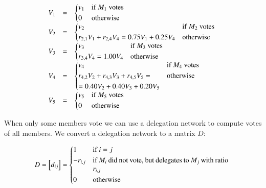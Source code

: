 \documentclass{sigchi}
\begin{document}
\begin{displaymath}
\begin{array}{rcl}
V_1 & = & \begin{dcases*}
 v_1 & if $M_1$ votes \\
 0 & otherwise \\
\end{dcases*} \\
V_2 & = & \begin{dcases*}
 v_2 & if $M_2$ votes \\
 r_{2,1} V_1 + r_{2,4} V_4 = 0.75 V_1 + 0.25 V_4 & otherwise \\
\end{dcases*} \\
V_3 & = & \begin{dcases*}
 v_3 & if $M_3$ votes \\
 r_{3,4} V_4 = 1.00 V_4 & otherwise \\
\end{dcases*} \\
V_4 & = & \begin{dcases*}
 v_4 & if $M_4$ votes \\
 r_{4,2} V_2+ r_{4,3} V_3 + r_{4,5} V_5 = & otherwise \\
 = 0.40 V_2 + 0.40 V_3 + 0.20 V_5 & \\
\end{dcases*} \\
V_5 & = & \begin{dcases*}
 v_5 & if $M_5$ votes \\
 0 & otherwise \\
\end{dcases*} \\
\end{array}
\end{displaymath}

When only some members vote we can use a delegation network to compute votes
of all members.
We convert a delegation network to a matrix $D$:

\begin{displaymath}
D = \left[d_{ij}\right] = \begin{dcases*}
 1 & if $i = j$ \\
 -r_{i,j} & \parbox[t]{.55\columnwidth}{if $M_i$ did not vote, but delegates to $M_j$ with ratio $r_{i,j}$} \\
 0 & otherwise \\
\end{dcases*}
\end{displaymath}
\end{document}
